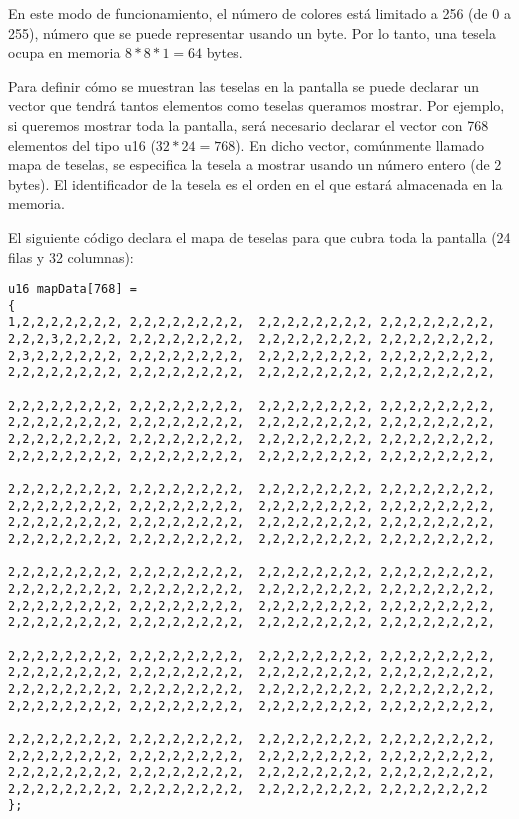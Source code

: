 En este modo de funcionamiento, el número de colores está limitado a 256 (de 0 a 255), número que se puede representar usando un byte. Por lo tanto, una tesela ocupa en memoria $8*8*1=64$ bytes. 

Para definir cómo se muestran las teselas en la pantalla se puede declarar un vector que tendrá tantos elementos como teselas queramos mostrar. Por ejemplo, si queremos mostrar toda la pantalla, será necesario declarar el vector con 768 elementos del tipo u16 ($32*24=768$). En dicho vector, comúnmente llamado mapa de teselas, se especifica la tesela a mostrar usando un número entero (de 2 bytes). El identificador de la tesela es el orden en el que estará almacenada en la memoria. 

El siguiente código declara el mapa de teselas para que cubra toda la pantalla (24 filas y 32 columnas):

\begin{lstlisting}
u16 mapData[768] =
{
1,2,2,2,2,2,2,2, 2,2,2,2,2,2,2,2,  2,2,2,2,2,2,2,2, 2,2,2,2,2,2,2,2,
2,2,2,3,2,2,2,2, 2,2,2,2,2,2,2,2,  2,2,2,2,2,2,2,2, 2,2,2,2,2,2,2,2,
2,3,2,2,2,2,2,2, 2,2,2,2,2,2,2,2,  2,2,2,2,2,2,2,2, 2,2,2,2,2,2,2,2,
2,2,2,2,2,2,2,2, 2,2,2,2,2,2,2,2,  2,2,2,2,2,2,2,2, 2,2,2,2,2,2,2,2,

2,2,2,2,2,2,2,2, 2,2,2,2,2,2,2,2,  2,2,2,2,2,2,2,2, 2,2,2,2,2,2,2,2,
2,2,2,2,2,2,2,2, 2,2,2,2,2,2,2,2,  2,2,2,2,2,2,2,2, 2,2,2,2,2,2,2,2,
2,2,2,2,2,2,2,2, 2,2,2,2,2,2,2,2,  2,2,2,2,2,2,2,2, 2,2,2,2,2,2,2,2,
2,2,2,2,2,2,2,2, 2,2,2,2,2,2,2,2,  2,2,2,2,2,2,2,2, 2,2,2,2,2,2,2,2,

2,2,2,2,2,2,2,2, 2,2,2,2,2,2,2,2,  2,2,2,2,2,2,2,2, 2,2,2,2,2,2,2,2,
2,2,2,2,2,2,2,2, 2,2,2,2,2,2,2,2,  2,2,2,2,2,2,2,2, 2,2,2,2,2,2,2,2,
2,2,2,2,2,2,2,2, 2,2,2,2,2,2,2,2,  2,2,2,2,2,2,2,2, 2,2,2,2,2,2,2,2,
2,2,2,2,2,2,2,2, 2,2,2,2,2,2,2,2,  2,2,2,2,2,2,2,2, 2,2,2,2,2,2,2,2,

2,2,2,2,2,2,2,2, 2,2,2,2,2,2,2,2,  2,2,2,2,2,2,2,2, 2,2,2,2,2,2,2,2,
2,2,2,2,2,2,2,2, 2,2,2,2,2,2,2,2,  2,2,2,2,2,2,2,2, 2,2,2,2,2,2,2,2,
2,2,2,2,2,2,2,2, 2,2,2,2,2,2,2,2,  2,2,2,2,2,2,2,2, 2,2,2,2,2,2,2,2,
2,2,2,2,2,2,2,2, 2,2,2,2,2,2,2,2,  2,2,2,2,2,2,2,2, 2,2,2,2,2,2,2,2,

2,2,2,2,2,2,2,2, 2,2,2,2,2,2,2,2,  2,2,2,2,2,2,2,2, 2,2,2,2,2,2,2,2,
2,2,2,2,2,2,2,2, 2,2,2,2,2,2,2,2,  2,2,2,2,2,2,2,2, 2,2,2,2,2,2,2,2,
2,2,2,2,2,2,2,2, 2,2,2,2,2,2,2,2,  2,2,2,2,2,2,2,2, 2,2,2,2,2,2,2,2,
2,2,2,2,2,2,2,2, 2,2,2,2,2,2,2,2,  2,2,2,2,2,2,2,2, 2,2,2,2,2,2,2,2,

2,2,2,2,2,2,2,2, 2,2,2,2,2,2,2,2,  2,2,2,2,2,2,2,2, 2,2,2,2,2,2,2,2,
2,2,2,2,2,2,2,2, 2,2,2,2,2,2,2,2,  2,2,2,2,2,2,2,2, 2,2,2,2,2,2,2,2,
2,2,2,2,2,2,2,2, 2,2,2,2,2,2,2,2,  2,2,2,2,2,2,2,2, 2,2,2,2,2,2,2,2,
2,2,2,2,2,2,2,2, 2,2,2,2,2,2,2,2,  2,2,2,2,2,2,2,2, 2,2,2,2,2,2,2,2
};
\end{lstlisting}

